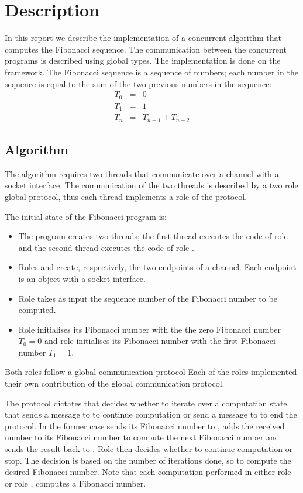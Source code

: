 \section{Description}

In this report we describe the implementation of a
concurrent algorithm that computes the Fibonacci
sequence. The communication between the concurrent 
programs is described using global types.
The implementation is done on the \Mungo framework.
The Fibonacci sequence is a sequence of numbers;
each number in the sequence is equal to the sum
of the two previous numbers in the sequence:
%
\begin{eqnarray*}
	T_0 &=& 0 \\
	T_1 &=& 1\\
	T_n &=& T_{n-1} + T_{n-2}
\end{eqnarray*}

\subsection{Algorithm}
\label{subsec:algorithm}
The algorithm requires two threads that communicate
over a channel with a socket interface.
The communication of the two threads is described by a
two role global protocol, thus each thread implements
a role of the protocol.

The initial state of the Fibonacci program is:
%
\begin{itemize}
	\item	The program creates two threads; the first thread
			executes the code of role \A and the second thread
			executes the code of role \B.

	\item	Roles \A and \B create, respectively,
			the two endpoints of a channel. Each endpoint
			is an object with a socket interface.

	\item	Role \A takes as input the sequence number
			of the Fibonacci number to be computed.

	\item	Role \A initialises its Fibonacci number
			with the
			the zero Fibonacci number $T_0 = 0$ and 
			role \B initialises its Fibonacci number with
			the first Fibonacci number $T_1 = 1$.
\end{itemize}

Both roles follow a global communication protocol
Each of the roles implemented their own contribution
of the global communication protocol.

The protocol dictates that \A decides whether to iterate over a computation
state that sends a message to \B to continue computation or send a message to \B
to end the protocol.
In the former case \A sends its Fibonacci number to \B, \B adds
the received number to its Fibonacci number to 
compute the next Fibonacci number and sends the result back to \A.
Role \A then decides whether to continue computation or stop. The decision
is based on the number of iterations done, so to compute the desired Fibonacci number.
Note that each computation performed in either role \A or role \B, computes a
Fibonacci number.


